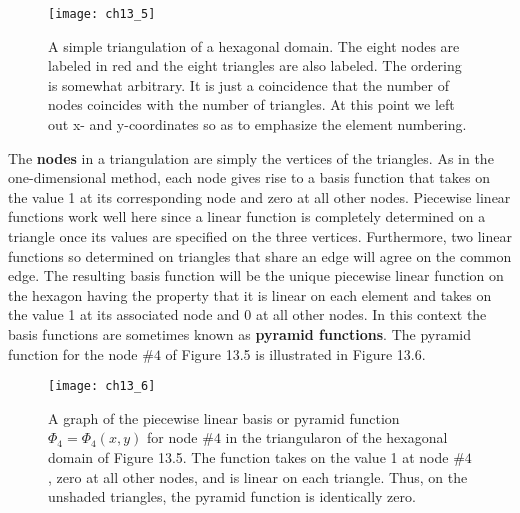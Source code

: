 \documentclass[../main.tex]{subfiles}
\begin{document}
\begin{figure}[H]
	\centering
	\texttt{[image: ch13\_5]}
	\caption{\textsf{A simple triangulation of a hexagonal domain. The eight nodes are labeled in red and the eight triangles are also labeled. The ordering is somewhat arbitrary. It is just a coincidence that the number of nodes coincides with the number of triangles. At this point we left out x- and y-coordinates so as to emphasize the element numbering.}}
	\label{pfig:ch13_5}
\end{figure}

The \textbf{nodes} in a triangulation are simply the vertices of the triangles. As in the one-dimensional method, each node gives rise to a basis function that takes on the value 1 at its corresponding node and zero at all other nodes. Piecewise linear functions work well here since a linear function is completely determined on a 
triangle once its values are specified on the three vertices. Furthermore, two linear 
functions so determined on triangles that share an edge will agree on the common 
edge. The resulting basis function will be the unique piecewise linear function on 
the hexagon having the property that it is linear on each element and takes on the 
value 1 at its associated node and 0 at all other nodes. In this context the basis 
functions are sometimes known as \textbf{pyramid functions}. The pyramid function for 
the node $\#4$ of Figure 13.5 is illustrated in Figure 13.6. 

\begin{figure}[H]
	\centering
	\texttt{[image: ch13\_6]}
	\caption{\textsf{A graph of the piecewise linear basis or pyramid function $\Phi_4 =\Phi_4 (x,y)$ for node $\#4$ in the triangularon of the hexagonal domain of Figure 13.5. The function takes on the value 1 at node $\#4$, zero at all other nodes, and is linear on each triangle. Thus, on the unshaded triangles, the pyramid function is identically zero. 
}}
	\label{pfig:ch13_6}
\end{figure}
\end{document}
